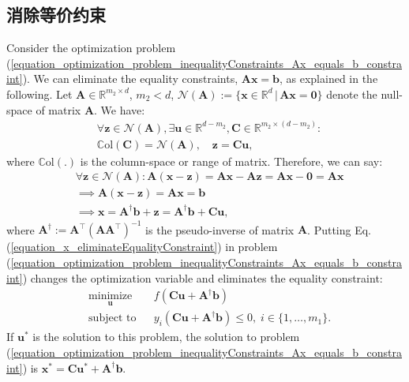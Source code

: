 \documentclass[lang=cn,10pt]{gorgeousnbook}
\numberwithin{equation}{section}%
\numberwithin{figure}{section}%
\begin{document}
\subsection{消除等价约束}
Consider the optimization problem (\ref{equation_optimization_problem_inequalityConstraints_Ax_equals_b_constraint}). We can eliminate the equality constraints, $\boldsymbol{Ax} = \boldsymbol{b}$, as explained in the following. 
Let $\boldsymbol{A} \in \mathbb{R}^{m_2 \times d}$, $m_2 < d$, $\mathcal{N}(\boldsymbol{A}) := \{\boldsymbol{x} \in \mathbb{R}^d\,|\,\boldsymbol{Ax} = \boldsymbol{0}\}$ denote the null-space of matrix $\boldsymbol{A}$. We have:
\begin{align*}
& \forall \boldsymbol{z} \in \mathcal{N}(\boldsymbol{A}), \exists \boldsymbol{u} \in \mathbb{R}^{d - m_2}, \boldsymbol{C} \in \mathbb{R}^{m_2 \times (d-m_2)}: \\
& \mathbb{C}\text{ol}(\boldsymbol{C}) = \mathcal{N}(\boldsymbol{A}), \quad \boldsymbol{z} = \boldsymbol{C} \boldsymbol{u},
\end{align*}
where $\mathbb{C}\text{ol}(.)$ is the column-space or range of matrix. 
Therefore, we can say:
\begin{align}
& \forall \boldsymbol{z} \in \mathcal{N}(\boldsymbol{A}): \boldsymbol{A}(\boldsymbol{x} - \boldsymbol{z}) = \boldsymbol{A}\boldsymbol{x} - \boldsymbol{A}\boldsymbol{z} = \boldsymbol{A}\boldsymbol{x} - \boldsymbol{0} = \boldsymbol{Ax} \nonumber\\
&\implies \boldsymbol{A}(\boldsymbol{x} - \boldsymbol{z}) = \boldsymbol{Ax} = \boldsymbol{b} \nonumber\\
&\implies \boldsymbol{x} = \boldsymbol{A}^\dagger \boldsymbol{b} + \boldsymbol{z} = \boldsymbol{A}^\dagger \boldsymbol{b} + \boldsymbol{C} \boldsymbol{u}, \label{equation_x_eliminateEqualityConstraint}
\end{align}
where $\boldsymbol{A}^\dagger := \boldsymbol{A}^\top (\boldsymbol{A}\boldsymbol{A}^\top)^{-1}$ is the pseudo-inverse of matrix $\boldsymbol{A}$. 
Putting Eq. (\ref{equation_x_eliminateEqualityConstraint}) in problem (\ref{equation_optimization_problem_inequalityConstraints_Ax_equals_b_constraint}) changes the optimization variable and eliminates the equality constraint: 
\begin{equation}
\begin{aligned}
& \underset{\boldsymbol{u}}{\text{minimize}}
& & f(\boldsymbol{C} \boldsymbol{u} + \boldsymbol{A}^\dagger \boldsymbol{b}) \\
& \text{subject to}
& & y_i(\boldsymbol{C} \boldsymbol{u} + \boldsymbol{A}^\dagger \boldsymbol{b}) \leq 0, \; i \in \{1, \ldots, m_1\}.
\end{aligned}
\end{equation}
If $\boldsymbol{u}^*$ is the solution to this problem, the solution to problem (\ref{equation_optimization_problem_inequalityConstraints_Ax_equals_b_constraint}) is $\boldsymbol{x}^* = \boldsymbol{C} \boldsymbol{u}^* + \boldsymbol{A}^\dagger \boldsymbol{b}$.
\end{document}
